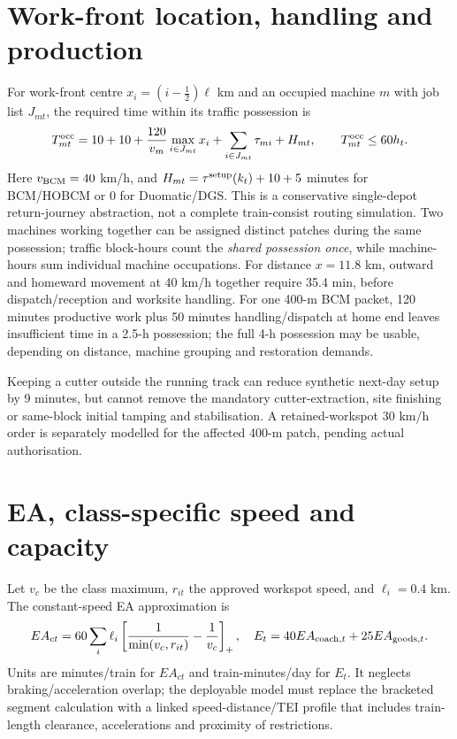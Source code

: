 \documentclass[10pt,a4paper]{article}
\begin{document}
\section{Work-front location, handling and production}
For work-front centre $x_i=(i-\tfrac12)\ell$ km and an occupied machine $m$ with job list $J_{mt}$, the required time within its traffic possession is
\begin{equation}
T^{\rm occ}_{mt}=10+10+\frac{120}{v_m}\max_{i\in J_{mt}}x_i +\sum_{i\in J_{mt}}\tau_{mi}+H_{mt},\qquad T^{\rm occ}_{mt}\le 60h_t.\label{eq:time}
\end{equation}
Here $v_{\rm BCM}=40$ km/h, and $H_{mt}=\tau^{\rm setup}(k_t)+10+5$ minutes for BCM/HOBCM or 0 for Duomatic/DGS. This is a conservative single-depot return-journey abstraction, not a complete train-consist routing simulation. Two machines working together can be assigned distinct patches during the same possession; traffic block-hours count the \emph{shared possession once}, while machine-hours sum individual machine occupations. For distance $x=11.8$ km, outward and homeward movement at 40 km/h together require 35.4 min, before dispatch/reception and worksite handling. For one 400-m BCM packet, 120 minutes productive work plus 50 minutes handling/dispatch at home end leaves insufficient time in a 2.5-h possession; the full 4-h possession may be usable, depending on distance, machine grouping and restoration demands.

Keeping a cutter outside the running track can reduce synthetic next-day setup by 9 minutes, but cannot remove the mandatory cutter-extraction, site finishing or same-block initial tamping and stabilisation. A retained-workspot 30 km/h order is separately modelled for the affected 400-m patch, pending actual authorisation.
\section{EA, class-specific speed and capacity}
Let $v_c$ be the class maximum, $r_{it}$ the approved workspot speed, and $\ell_i=0.4$ km. The constant-speed EA approximation is
\begin{equation}
EA_{ct}=60\sum_i\ell_i\left[\frac{1}{\min(v_c,r_{it})}-\frac{1}{v_c}\right]_+,\quad
E_t=40EA_{{\rm coach},t}+25EA_{{\rm goods},t}.\label{eq:ea}
\end{equation}
Units are minutes/train for $EA_{ct}$ and train-minutes/day for $E_t$. It neglects braking/acceleration overlap; the deployable model must replace the bracketed segment calculation with a linked speed-distance/TEI profile that includes train-length clearance, accelerations and proximity of restrictions.
\end{document}
